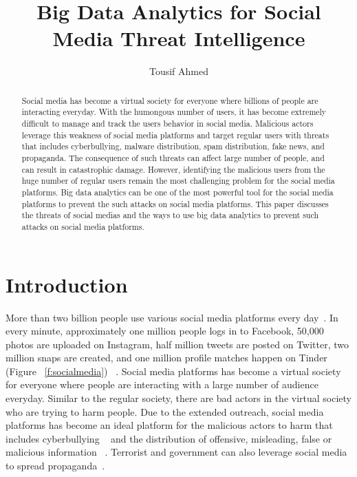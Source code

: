 \documentclass[sigconf]{acmart}
\begin{document}
\title{Big Data Analytics for Social Media Threat Intelligence}


\author{Tousif Ahmed}



\begin{abstract}
Social media has become a virtual society for everyone where billions of people are  interacting  everyday. With the humongous number of users, it has become extremely difficult to manage and track the users behavior in social media.  Malicious actors leverage this weakness of social media platforms and target regular users with threats that includes cyberbullying, malware distribution, spam distribution, fake news, and propaganda.  The consequence of such threats can  affect large number of people, and can result in catastrophic damage. However, identifying the malicious users from the huge number of regular users remain the most challenging problem for the social media platforms. Big data analytics can be one of the most powerful tool  for the social media platforms to prevent the such attacks on social media platforms. This paper discusses the threats of social medias and the ways to use big data analytics to prevent such attacks on social media platforms. 

\end{abstract}



\maketitle



\section{Introduction}
More than two billion people use various social media platforms every day~\cite{social-media}. In every minute, approximately one million people logs in to Facebook, 50,000 photos are uploaded on Instagram, half million tweets are posted on Twitter, two million snaps are created, and one million profile matches happen on Tinder (Figure ~\ref{f:socialmedia}) ~\cite{social-media2}. Social media platforms has become a virtual society for everyone where people are interacting with a large number of audience everyday. Similar to the regular society, there are bad actors in the virtual society who are trying to harm people. Due to the extended outreach, social media platforms has become an ideal platform for the malicious actors to harm that includes cyberbullying ~\cite{Slonje:2013,Kwan:2013,Singh:2017,Cheng:2017,HosseinmardiMRH15} and the distribution of offensive, misleading, false or malicious information ~\cite{Menczer:2016, socialbots-CACM, Shao15hoaxy, Shao17hoaxybots}. Terrorist and government can also leverage social media to spread propaganda~\cite{Aro2016,Weimann:2006}.
\end{document}
